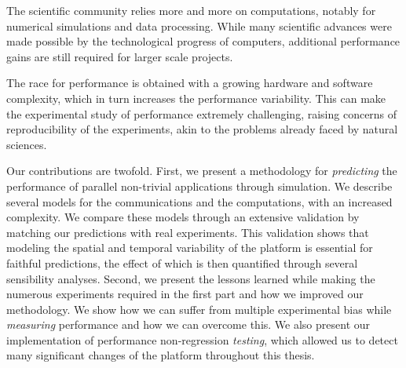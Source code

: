 The scientific community relies more and more on computations, notably for numerical simulations and data processing.
While many scientific advances were made possible by the technological progress of computers, additional performance
gains are still required for larger scale projects.

The race for performance is obtained with a growing hardware and software complexity, which in turn increases the
performance variability. This can make the experimental study of performance extremely challenging, raising concerns of
reproducibility of the experiments, akin to the problems already faced by natural sciences.

Our contributions are twofold. First, we present a methodology for \emph{predicting} the performance of parallel
non-trivial applications through simulation. We describe several models for the communications and the computations,
with an increased complexity. We compare these models through an extensive validation by matching our predictions with
real experiments. This validation shows that modeling the spatial and temporal variability of the platform is essential
for faithful predictions, the effect of which is then quantified through several sensibility analyses.  Second, we
present the lessons learned while making the numerous experiments required in the first part and how we improved our
methodology. We show how we can suffer from multiple experimental bias while \emph{measuring} performance and how we can
overcome this. We also present our implementation of performance non-regression \emph{testing}, which allowed us to
detect many significant changes of the platform throughout this thesis.
